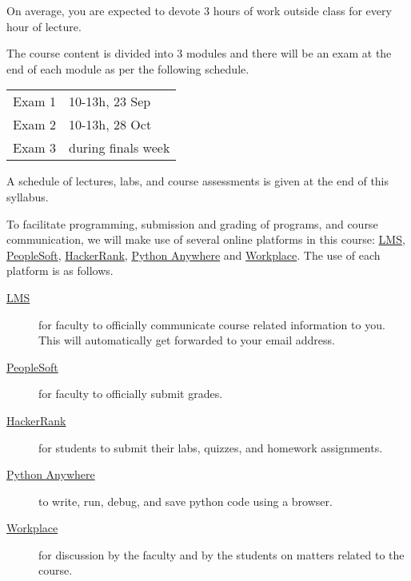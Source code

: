 \documentclass[a4paper]{article}
\begin{document}
On average, you are expected to devote 3 hours of work outside class for every hour of lecture.

The course content is divided into 3 modules and there will be an exam at the end of each module as per the following schedule.\\
\begin{tabular}{l@{ : }l}
  Exam 1 & 10-13h, 23 Sep \\
  Exam 2 & 10-13h, 28 Oct \\
  Exam 3 & during finals week
\end{tabular}

A schedule of lectures, labs, and course assessments is given at the end of this syllabus.

To facilitate programming, submission and grading of programs, and course communication, we will make use of several online platforms in this course: \href{https://lms.habib.edu.pk}{LMS}, \href{https://pscs.habib.edu.pk/}{PeopleSoft}, \href{https://www.hackerrank.com/}{HackerRank}, \href{https://www.pythonanywhere.com}{Python Anywhere} and \href{https://habibedu.facebook.com/groups/1809008982742834/}{Workplace}. The use of each platform is as follows.
\begin{description}
\item [\href{https://lms.habib.edu.pk}{LMS}] for faculty to officially communicate course related information to you. This will automatically get forwarded to your email address.
\item [\href{https://pscs.habib.edu.pk/}{PeopleSoft}] for faculty to officially submit grades.
\item [\href{https://www.hackerrank.com/}{HackerRank}] for students to submit their labs, quizzes, and homework assignments.
\item[\href{https://www.pythonanywhere.com}{Python Anywhere}] to write, run, debug, and save python code using a browser.
\item [\href{https://habibedu.facebook.com/groups/1809008982742834/}{Workplace}] for discussion by the faculty and by the students on matters related to the course.
\end{description}
\end{document}

